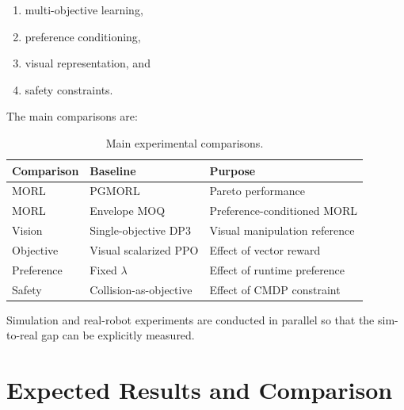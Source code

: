 \documentclass[journal]{IEEEtran}
\begin{document}
\begin{enumerate}
    \item multi-objective learning,
    \item preference conditioning,
    \item visual representation, and
    \item safety constraints.
\end{enumerate}

The main comparisons are:

\begin{table}[t]
\centering
\caption{Main experimental comparisons.}
\label{tab:comparisons}

\renewcommand{\arraystretch}{1.2}

\footnotesize

\begin{tabular}{l l l}
\toprule
\textbf{Comparison}
& \textbf{Baseline}
& \textbf{Purpose} \\
\midrule

MORL
& PGMORL
& Pareto performance \\

MORL
& Envelope MOQ
& Preference-conditioned MORL \\

Vision
& Single-objective DP3
& Visual manipulation reference \\

Objective
& Visual scalarized PPO
& Effect of vector reward \\

Preference
& Fixed $\lambda$
& Effect of runtime preference \\

Safety
& Collision-as-objective
& Effect of CMDP constraint \\

\bottomrule
\end{tabular}
\end{table}

Simulation and real-robot experiments are conducted in parallel so that
the sim-to-real gap can be explicitly measured.


\section{Expected Results and Comparison}
\end{document}
